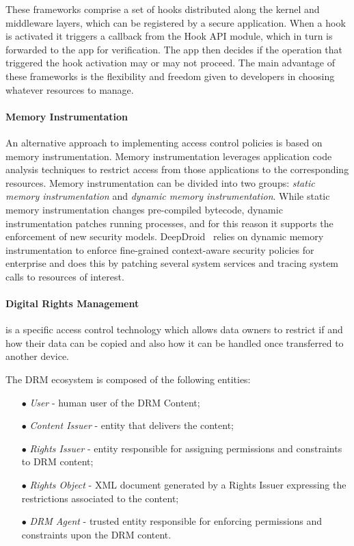 These frameworks comprise a set of hooks distributed along the kernel and middleware layers, which can be registered by a secure application. When a hook is activated it triggers a callback from the Hook API module, which in turn is forwarded to the app for verification. The app then decides if the operation that triggered the hook activation may or may not proceed. The main advantage of these frameworks is the flexibility and freedom given to developers in choosing whatever resources to manage.

\paragraph{\textbf{Memory Instrumentation}}

An alternative approach to implementing access control policies is based on memory instrumentation. Memory instrumentation leverages application code analysis techniques to restrict access from those applications to the corresponding resources. Memory instrumentation can be divided into two groups: \emph{static memory instrumentation} and \emph{dynamic memory instrumentation}. While static memory instrumentation changes pre-compiled bytecode, dynamic instrumentation patches running processes, and for this reason it supports the enforcement of new security models. DeepDroid~\cite{wang2015deepdroid} relies on dynamic memory instrumentation to enforce fine-grained context-aware security policies for enterprise and does this by patching several system services and tracing system calls to resources of interest.

\paragraph{\textbf{Digital Rights Management}} is a specific access control technology which allows data owners to restrict if and how their data can be copied and also how it can be handled once transferred to another device.

The \ac{DRM} ecosystem is composed of the following entities:

\begin{itemize}
	\item[$\bullet$] \emph{User} - human user of the DRM Content;
	\item[$\bullet$] \emph{Content Issuer} - entity that delivers the content;
	\item[$\bullet$] \emph{Rights Issuer} - entity responsible for assigning permissions and constraints to \ac{DRM} content;
	\item[$\bullet$] \emph{Rights Object} - XML document generated by a Rights Issuer expressing the restrictions associated to the content;
	\item[$\bullet$] \emph{\ac{DRM} Agent} - trusted entity responsible for enforcing permissions and constraints upon the \ac{DRM} content.
\end{itemize}

